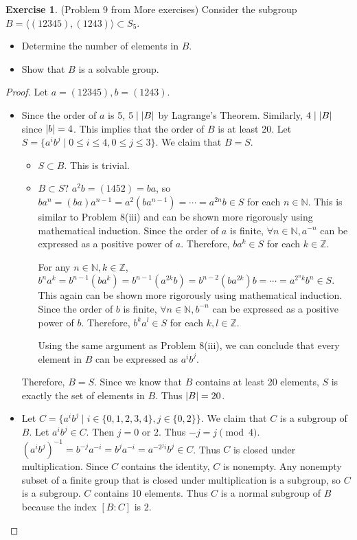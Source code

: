\documentclass[12pt, psamsfonts]{amsart}
\theoremstyle{definition}
\newtheorem*{exer}{Exercise}
\theoremstyle{remark}
\numberwithin{equation}{section}
\begin{document}
\begin{exer}{(Problem 9 from More exercises)}
  Consider the subgroup $B = \langle (12345), (1243) \rangle \subset S_5$.
  \begin{itemize}
    \item
      Determine the number of elements in $B$.
    \item
      Show that $B$ is a solvable group.
  \end{itemize}
\end{exer}

\begin{proof}
  Let $a = (12345), b = (1243)$.
  \begin{itemize}
    \item
      Since the order of $a$ is 5, $5 \mid \abs{B}$ by Lagrange's Theorem.
      Similarly, $4 \mid \abs{B}$ since $\abs{b} = 4$.
      This implies that the order of $B$ is at least 20.
      Let $S = \{ a^ib^j \mid 0 \leq i \leq 4, 0 \leq j \leq 3 \}$.
      We claim that $B = S$.
      \begin{itemize}
        \item
          $S \subset B$.
          This is trivial.
        \item
          $B \subset S$?
          $a^2b = (1452) = ba$, so $ba^n = (ba)a^{n - 1} = a^2(ba^{n-1}) = \cdots = a^{2n}b \in S$ for each $n \in \mathbb{N}$.
          This is similar to Problem 8(iii) and can be shown more rigorously using mathematical induction.
          Since the order of $a$ is finite, $\forall n \in \mathbb{N}, a^{-n}$ can be expressed as a positive power of $a$.
          Therefore, $ba^k \in S$ for each $k \in \mathbb{Z}$.

          For any $n \in \mathbb{N}, k \in \mathbb{Z}$, $b^na^k = b^{n - 1}(ba^k) = b^{n - 1}(a^{2k}b) = b^{n - 2}(ba^{2k})b = \cdots = a^{2^nk}b^n \in S$.
          This again can be shown more rigorously using mathematical induction.
          Since the order of $b$ is finite, $\forall n \in \mathbb{N}, b^{-n}$ can be expressed as a positive power of $b$.
          Therefore, $b^ka^l \in S$ for each $k, l \in \mathbb{Z}$.

          Using the same argument as Problem 8(iii), we can conclude that every element in $B$ can be expressed as $a^ib^j$.
      \end{itemize}
      Therefore, $B = S$.
      Since we know that $B$ contains at least 20 elements, $S$ is exactly the set of elements in $B$.
      Thus $\abs{B} = 20$.
    \item
      Let $C = \{ a^ib^j \mid i \in \{ 0, 1, 2, 3, 4 \}, j \in \{ 0, 2 \} \}$.
      We claim that $C$ is a subgroup of $B$.
      Let $a^ib^j \in C$.
      Then $j = 0$ or $2$.
      Thus $-j = j \pmod 4$.
      $(a^ib^j)^{-1} = b^{-j}a^{-i} = b^ja^{-i} = a^{-2^{j}i}b^{j} \in C$.
      Thus $C$ is closed under multiplication.
      Since $C$ contains the identity, $C$ is nonempty.
      Any nonempty subset of a finite group that is closed under multiplication is a subgroup, so $C$ is a subgroup.
      $C$ contains 10 elements.
      Thus $C$ is a normal subgroup of $B$ because the index $[B:C]$ is $2$.


\end{itemize}
\end{proof}
\end{document}
